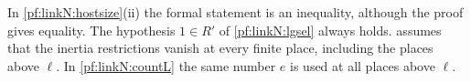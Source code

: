 \begin{remark}\label{pf:linkN:remaux}
In \cref{pf:linkN:hostsize}(ii) the formal statement is an inequality, although the proof gives equality. The hypothesis $1\in R'$ of
\cref{pf:linkN:lgsel} always holds.  assumes that the inertia restrictions vanish at every finite place, including the
places above $\ell$. In \cref{pf:linkN:countL} the same number $e$ is used at all places above $\ell$.
\end{remark}

